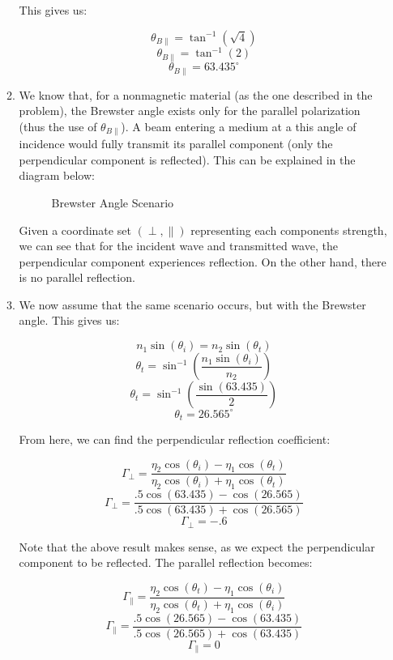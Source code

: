 \begin{enumerate}
\begin{enumerate}
        This gives us:

        $$\theta_{B\parallel}=\tan^{-1}\left( \sqrt{4} \right)$$
        $$\theta_{B\parallel}=\tan^{-1}\left( 2\right)$$
        $$\boxed{\theta_{B\parallel}=63.435^{\circ}}$$

      \item 

        We know that, for a nonmagnetic material (as the one described in the problem), the Brewster angle exists only for the parallel polarization (thus the use of $\theta_{B\parallel}$). A beam entering a medium at a this angle of incidence would fully transmit its parallel component (only the perpendicular component is reflected). This can be explained in the diagram below:

        \begin{figure}[H]
          \centering
          
          \caption{Brewster Angle Scenario}
          \label{fig:7}
        \end{figure}

        Given a coordinate set $(\perp,\parallel)$ representing each components strength, we can see that for the incident wave and transmitted wave, the perpendicular component experiences reflection. On the other hand, there is no parallel reflection.

      \item 

        We now assume that the same scenario occurs, but with the Brewster angle. This gives us:

        $$n_1\sin(\theta_i)=n_2\sin(\theta_t)$$
        $$\theta_t=\sin^{-1}\left(\frac{n_1\sin(\theta_i)}{n_2}\right)$$
        $$\theta_t=\sin^{-1}\left(\frac{\sin(63.435)}{2}\right)$$
        $$\boxed{\theta_t=26.565^{\circ}}$$

        From here, we can find the perpendicular reflection coefficient:

        $$\Gamma_{\perp}=\frac{\eta_2\cos(\theta_i)-\eta_1\cos(\theta_t)}{\eta_2\cos(\theta_i)+\eta_1\cos(\theta_t)}$$
        $$\Gamma_{\perp}=\frac{.5\cos(63.435)-\cos(26.565)}{.5\cos(63.435)+\cos(26.565)}$$
        $$\boxed{\Gamma_{\perp}=-.6}$$

        Note that the above result makes sense, as we expect the perpendicular component to be reflected. The parallel reflection becomes:

        $$\Gamma_{\parallel}=\frac{\eta_2\cos(\theta_t)-\eta_1\cos(\theta_i)}{\eta_2\cos(\theta_t)+\eta_1\cos(\theta_i)}$$
        $$\Gamma_{\parallel}=\frac{.5\cos(26.565)-\cos(63.435)}{.5\cos(26.565)+\cos(63.435)}$$
        $$\boxed{\Gamma_{\parallel}=0}$$


\end{enumerate}
\end{enumerate}
